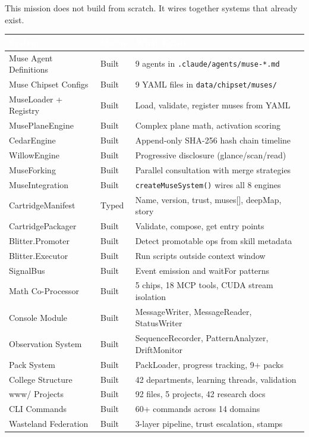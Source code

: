 \documentclass[11pt,letterpaper]{article}
\newcommand{\tableheader}[1]{\textbf{\sffamily\textcolor{white}{#1}}}
\begin{document}
This mission does not build from scratch. It wires together systems that already exist.

\begin{center}
\begin{tabularx}{\textwidth}{L{3.5cm}C{2cm}X}
\toprule
{}
\tableheader{System} & \tableheader{Status} & \tableheader{What Exists} \\
\midrule
Muse Agent Definitions & Built & 9 agents in \texttt{.claude/agents/muse-*.md} \\
Muse Chipset Configs & Built & 9 YAML files in \texttt{data/chipset/muses/} \\
MuseLoader + Registry & Built & Load, validate, register muses from YAML \\
MusePlaneEngine & Built & Complex plane math, activation scoring \\
CedarEngine & Built & Append-only SHA-256 hash chain timeline \\
WillowEngine & Built & Progressive disclosure (glance/scan/read) \\
MuseForking & Built & Parallel consultation with merge strategies \\
MuseIntegration & Built & \texttt{createMuseSystem()} wires all 8 engines \\
CartridgeManifest & Typed & Name, version, trust, muses[], deepMap, story \\
CartridgePackager & Built & Validate, compose, get entry points \\
Blitter.Promoter & Built & Detect promotable ops from skill metadata \\
Blitter.Executor & Built & Run scripts outside context window \\
SignalBus & Built & Event emission and waitFor patterns \\
Math Co-Processor & Built & 5 chips, 18 MCP tools, CUDA stream isolation \\
Console Module & Built & MessageWriter, MessageReader, StatusWriter \\
Observation System & Built & SequenceRecorder, PatternAnalyzer, DriftMonitor \\
Pack System & Built & PackLoader, progress tracking, 9+ packs \\
College Structure & Built & 42 departments, learning threads, validation \\
www/ Projects & Built & 92 files, 5 projects, 42 research docs \\
CLI Commands & Built & 60+ commands across 14 domains \\
Wasteland Federation & Built & 3-layer pipeline, trust escalation, stamps \\
\bottomrule
\end{tabularx}
\end{center}
\end{document}
